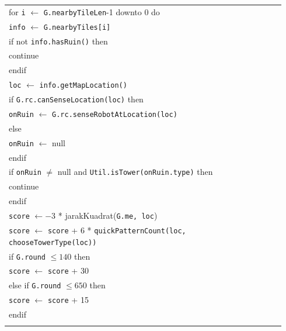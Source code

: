 \documentclass{article}
\newenvironment{pseudobox}
{
\centering
\begin{longtable}{|p{0.94\linewidth}|}
\hline
}
{
\\ \hline
\end{longtable}
\vspace{0.05cm}
}
\begin{document}
\begin{enumerate}[label=\alph*.]
\begin{enumerate}[label=\alph*.]
\begin{pseudobox}
\hspace*{1.5em}for \texttt{i} $\leftarrow$ \texttt{G.nearbyTileLen}-1 downto 0 do \\
\hspace*{3em}\texttt{info} $\leftarrow$ \texttt{G.nearbyTiles[i]} \\

\hspace*{3em}if not \texttt{info.hasRuin()} then \\
\hspace*{4.5em}continue \\
\hspace*{3em}endif \\

\hspace*{3em}\texttt{loc} $\leftarrow$ \texttt{info.getMapLocation()} \\

\hspace*{3em}if \texttt{G.rc.canSenseLocation(loc)} then \\
\hspace*{4.5em}\texttt{onRuin} $\leftarrow$ \texttt{G.rc.senseRobotAtLocation(loc)} \\
\hspace*{3em}else \\
\hspace*{4.5em}\texttt{onRuin} $\leftarrow$ null \\
\hspace*{3em}endif \\

\hspace*{3em}if \texttt{onRuin} $\neq$ null and \texttt{Util.isTower(onRuin.type)} then \\
\hspace*{4.5em}continue \\
\hspace*{3em}endif \\

\hspace*{3em}\texttt{score} $\leftarrow -3$ * jarakKuadrat(\texttt{G.me, loc}) \\
\hspace*{3em}\texttt{score} $\leftarrow$ \texttt{score} + 6 * \texttt{quickPatternCount(loc, chooseTowerType(loc))} \\

\hspace*{3em}if \texttt{G.round} $\leq 140$ then \\
\hspace*{4.5em}\texttt{score} $\leftarrow$ \texttt{score} + 30 \\
\hspace*{3em}else if \texttt{G.round} $\leq 650$ then \\
\hspace*{4.5em}\texttt{score} $\leftarrow$ \texttt{score} + 15 \\
\hspace*{3em}endif \\


\end{pseudobox}
\end{enumerate}
\end{enumerate}
\end{document}
